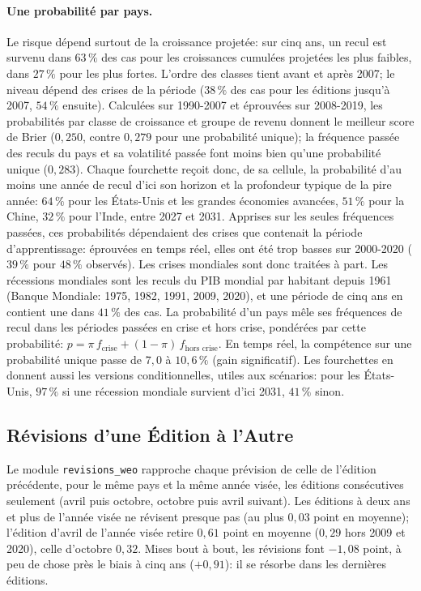 \documentclass[11pt,a4paper]{article}
\begin{document}
\paragraph{Une probabilité par pays.} Le risque dépend surtout de la croissance projetée: sur cinq ans, un recul est survenu dans $63\,\%$ des cas pour les croissances cumulées projetées les plus faibles, dans $27\,\%$ pour les plus fortes. L'ordre des classes tient avant et après 2007; le niveau dépend des crises de la période ($38\,\%$ des cas pour les éditions jusqu'à 2007, $54\,\%$ ensuite). Calculées sur 1990-2007 et éprouvées sur 2008-2019, les probabilités par classe de croissance et groupe de revenu donnent le meilleur score de Brier ($0{,}250$, contre $0{,}279$ pour une probabilité unique); la fréquence passée des reculs du pays et sa volatilité passée font moins bien qu'une probabilité unique ($0{,}283$). Chaque fourchette reçoit donc, de sa cellule, la probabilité d'au moins une année de recul d'ici son horizon et la profondeur typique de la pire année: $64\,\%$ pour les États-Unis et les grandes économies avancées, $51\,\%$ pour la Chine, $32\,\%$ pour l'Inde, entre 2027 et 2031. Apprises sur les seules fréquences passées, ces probabilités dépendaient des crises que contenait la période d'apprentissage: éprouvées en temps réel, elles ont été trop basses sur 2000-2020 ($39\,\%$ pour $48\,\%$ observés). Les crises mondiales sont donc traitées à part. Les récessions mondiales sont les reculs du PIB mondial par habitant depuis 1961 (Banque Mondiale: 1975, 1982, 1991, 2009, 2020), et une période de cinq ans en contient une dans $41\,\%$ des cas. La probabilité d'un pays mêle ses fréquences de recul dans les périodes passées en crise et hors crise, pondérées par cette probabilité: $p = \pi\, f_{\text{crise}} + (1 - \pi)\, f_{\text{hors crise}}$. En temps réel, la compétence sur une probabilité unique passe de $7{,}0$ à $10{,}6\,\%$ (gain significatif). Les fourchettes en donnent aussi les versions conditionnelles, utiles aux scénarios: pour les États-Unis, $97\,\%$ si une récession mondiale survient d'ici 2031, $41\,\%$ sinon.

\subsection{Révisions d'une Édition à l'Autre}
Le module \texttt{revisions\_weo} rapproche chaque prévision de celle de l'édition précédente, pour le même pays et la même année visée, les éditions consécutives seulement (avril puis octobre, octobre puis avril suivant). Les éditions à deux ans et plus de l'année visée ne révisent presque pas (au plus $0{,}03$ point en moyenne); l'édition d'avril de l'année visée retire $0{,}61$ point en moyenne ($0{,}29$ hors 2009 et 2020), celle d'octobre $0{,}32$. Mises bout à bout, les révisions font $-1{,}08$ point, à peu de chose près le biais à cinq ans ($+0{,}91$): il se résorbe dans les dernières éditions.
\end{document}
